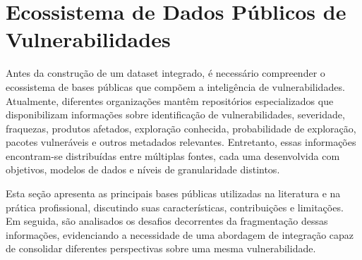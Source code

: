 \section{Ecossistema de Dados Públicos de Vulnerabilidades}

Antes da construção de um dataset integrado, é necessário compreender o ecossistema de bases públicas que compõem a inteligência de vulnerabilidades. Atualmente, diferentes organizações mantêm repositórios especializados que disponibilizam informações sobre identificação de vulnerabilidades, severidade, fraquezas, produtos afetados, exploração conhecida, probabilidade de exploração, pacotes vulneráveis e outros metadados relevantes. Entretanto, essas informações encontram-se distribuídas entre múltiplas fontes, cada uma desenvolvida com objetivos, modelos de dados e níveis de granularidade distintos.

Esta seção apresenta as principais bases públicas utilizadas na literatura e na prática profissional, discutindo suas características, contribuições e limitações. Em seguida, são analisados os desafios decorrentes da fragmentação dessas informações, evidenciando a necessidade de uma abordagem de integração capaz de consolidar diferentes perspectivas sobre uma mesma vulnerabilidade.




